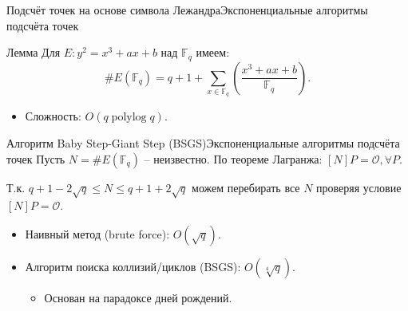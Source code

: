\documentclass{beamer}
\begin{document}
\begin{frame}{Подсчёт точек на основе символа Лежандра}{Экспоненциальные алгоритмы подсчёта точек}
\begin{block}{Лемма}
Для $E: y^2 = x^3 + ax + b$ над $\mathbb{F}_q$ имеем:
\[
\# E(\mathbb{F}_q) = q + 1 + \sum\limits_{x \in \mathbb{F}_q} {\left(\frac{x^3 + ax + b}{\mathbb{F}_q} \right)}.
\]
\end{block}

\begin{itemize}
    \item Сложность: $O(q \operatorname{polylog}{q})$.
\end{itemize}
\end{frame}

\begin{frame}{Алгоритм Baby Step-Giant Step (BSGS)}{Экспоненциальные алгоритмы подсчёта точек}
 Пусть $N = \#E(\mathbb{F}_q)$ -- неизвестно. По теореме Лагранжа: $[N] P = \mathcal{O}, \forall P$.

\vspace{0.em}
Т.к. $q + 1 - 2 \sqrt{q} \leq N \leq q + 1 + 2 \sqrt{q}$ \structure{$\implies$} можем перебирать все $N$ проверяя условие $[N] P = \mathcal{O}$.

\begin{itemize}
    \item Наивный метод (brute force): $O(\sqrt{q})$.
    \item Алгоритм поиска коллизий/циклов (BSGS): $O(\sqrt[4]{q})$.
    \begin{itemize}
    	\item Основан на парадоксе дней рождений.
    \end{itemize}
\end{itemize}
\end{frame}
\end{document}
